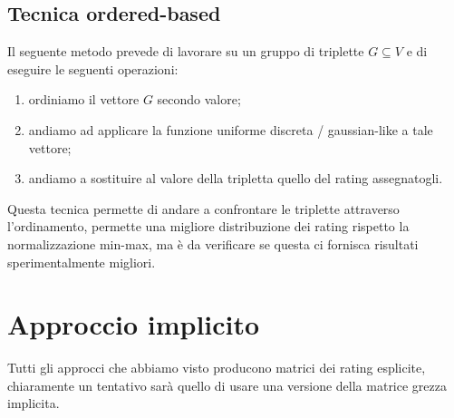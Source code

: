\subsection{Tecnica ordered-based}
Il seguente metodo prevede di lavorare su un gruppo di triplette $G \subseteq V$ e di eseguire le seguenti operazioni:
\begin{enumerate}
    \item ordiniamo il vettore $G$ secondo valore;
    \item andiamo ad applicare la funzione uniforme discreta / gaussian-like a tale vettore;
    \item andiamo a sostituire al valore della tripletta quello del rating assegnatogli.
\end{enumerate}

Questa tecnica permette di andare a confrontare le triplette attraverso l'ordinamento, permette una migliore distribuzione dei rating rispetto la normalizzazione min-max, ma è da verificare se questa ci fornisca risultati sperimentalmente migliori.

\section{Approccio implicito}
Tutti gli approcci che abbiamo visto producono matrici dei rating esplicite, chiaramente un tentativo sarà quello di usare una versione della matrice grezza implicita.